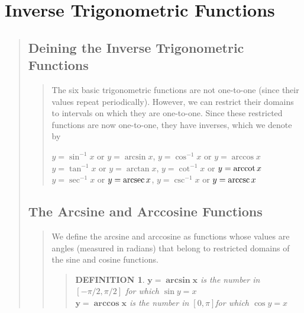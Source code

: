 \documentclass{report}
\newtheorem*{definition}{DEFINITION}
\begin{document}

\section{Inverse Trigonometric Functions}
\begin{quote}

	\subsection{Deining the Inverse Trigonometric Functions}
	\begin{quote}

		The six basic trigonometric functions are not one-to-one (since their values repeat periodically). However, we can restrict their domains to intervals on which they are one-to-one. Since these restricted functions are now one-to-one, they have inverses, which we denote by
		\begin{center}
			$y = \sin^{-1} x$ or $y = \arcsin x$,    $y = \cos^{-1} x$ or $y = \arccos x$\\
			$y = \tan^{-1} x$ or $y = \arctan x$,    $y = \cot^{-1} x$ or $y = \arccot x$\\
			$y = \sec^{-1} x$ or $y = \arcsec x$,    $y = \csc^{-1} x$ or $y = \arccsc x$
		\end{center}

	\end{quote}

	\subsection{The Arcsine and Arccosine Functions}
	\begin{quote}
		We define the arcsine and arccosine as functions whose values are angles (measured in radians) that belong to restricted domains of the sine and cosine functions.

		\begin{quote}
		\begin{definition}
			\mbox{}\par
				$\mathbf{y=\arcsin x}$ is the number in $[-\pi /2, \pi/2]$ for which $\sin y = x$\\
				$\mathbf{y=\arccos x}$ is the number in $[0,\pi]$for which $\cos y = x$


\end{definition}
\end{quote}
\end{quote}
\end{quote}
\end{document}
